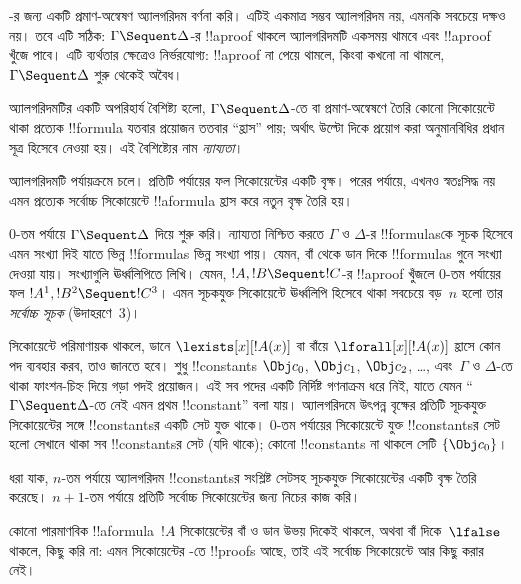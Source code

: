\documentclass[../../../include/open-logic-section]{subfiles}
\begin{document}


-র জন্য একটি প্রমাণ-অন্বেষণ অ্যালগরিদম বর্ণনা করি। এটিই একমাত্র
সম্ভব অ্যালগরিদম নয়, এমনকি সবচেয়ে দক্ষও নয়। তবে এটি সঠিক:
$\Gamma \Sequent \Delta$-র !!a{proof} থাকলে অ্যালগরিদমটি
একসময় থামবে এবং !!a{proof} খুঁজে পাবে। এটি ব্যর্থতার ক্ষেত্রেও
নির্ভরযোগ্য: !!a{proof} না পেয়ে থামলে, কিংবা কখনো না থামলে,
$\Gamma \Sequent \Delta$ শুরু থেকেই অবৈধ।

অ্যালগরিদমটির একটি অপরিহার্য বৈশিষ্ট্য হলো, $\Gamma \Sequent \Delta$-তে
বা প্রমাণ-অন্বেষণে তৈরি কোনো সিকোয়েন্টে থাকা প্রত্যেক !!{formula}
যতবার প্রয়োজন ততবার “হ্রাস” পায়; অর্থাৎ উল্টো দিকে প্রয়োগ করা
অনুমানবিধির প্রধান সূত্র হিসেবে নেওয়া হয়। এই বৈশিষ্ট্যের নাম
\emph{ন্যায্যতা}।

অ্যালগরিদমটি পর্যায়ক্রমে চলে। প্রতিটি পর্যায়ের ফল সিকোয়েন্টের একটি
বৃক্ষ। পরের পর্যায়ে, এখনও স্বতঃসিদ্ধ নয় এমন প্রত্যেক সর্বোচ্চ
সিকোয়েন্টে !!a{formula} হ্রাস করে নতুন বৃক্ষ তৈরি হয়।

$0$-তম পর্যায়ে $\Gamma \Sequent \Delta$ দিয়ে শুরু করি। ন্যায্যতা
নিশ্চিত করতে $\Gamma$ ও $\Delta$-র !!{formula}sকে সূচক হিসেবে
এমন সংখ্যা দিই যাতে ভিন্ন !!{formula}s ভিন্ন সংখ্যা পায়। যেমন, বাঁ
থেকে ডান দিকে !!{formula}s গুনে সংখ্যা দেওয়া যায়। সংখ্যাগুলি ঊর্ধ্বলিপিতে
লিখি। যেমন, $!A, !B \Sequent !C$-র !!a{proof} খুঁজলে
$0$-তম পর্যায়ের ফল $!A^1, !B^2 \Sequent !C^3$। এমন
সূচকযুক্ত সিকোয়েন্টে ঊর্ধ্বলিপি হিসেবে থাকা সবচেয়ে বড়~$n$ হলো তার
\emph{সর্বোচ্চ সূচক} (উদাহরণে~$3$)।

সিকোয়েন্টে পরিমাণায়ক থাকলে, ডানে $\lexists[x][!A(x)]$ বা বাঁয়ে
$\lforall[x][!A(x)]$ হ্রাসে কোন পদ ব্যবহার করব, তাও জানতে হবে।
শুধু !!{constant}s $\Obj c_0$, $\Obj c_1$, $\Obj c_2$, \dots,
এবং~$\Gamma$ ও $\Delta$-তে থাকা ফাংশন-চিহ্ন দিয়ে গড়া পদই
প্রয়োজন। এই সব পদের একটি নির্দিষ্ট গণনাক্রম ধরে নিই, যাতে যেমন
“$\Gamma \Sequent \Delta$-তে নেই এমন প্রথম !!{constant}” বলা যায়।
অ্যালগরিদমে উৎপন্ন বৃক্ষের প্রতিটি সূচকযুক্ত সিকোয়েন্টের সঙ্গে
!!{constant}sর একটি সেট যুক্ত থাকে। $0$-তম পর্যায়ের সিকোয়েন্টে
যুক্ত !!{constant}sর সেট হলো সেখানে থাকা সব !!{constant}sর
সেট (যদি থাকে); কোনো !!{constant}s না থাকলে সেটি $\{\Obj c_0\}$।

ধরা যাক, $n$-তম পর্যায়ে অ্যালগরিদম !!{constant}sর সংশ্লিষ্ট
সেটসহ সূচকযুক্ত সিকোয়েন্টের একটি বৃক্ষ তৈরি করেছে। $n+1$-তম
পর্যায়ে প্রতিটি সর্বোচ্চ সিকোয়েন্টের জন্য নিচের কাজ করি।

কোনো পারমাণবিক !!a{formula}~$!A$ সিকোয়েন্টের বাঁ ও ডান উভয় দিকেই থাকলে,
অথবা বাঁ দিকে~$\lfalse$ থাকলে, কিছু করি না: এমন সিকোয়েন্টের
-তে !!{proof}s আছে, তাই এই সর্বোচ্চ সিকোয়েন্টে
আর কিছু করার নেই।
\end{document}
